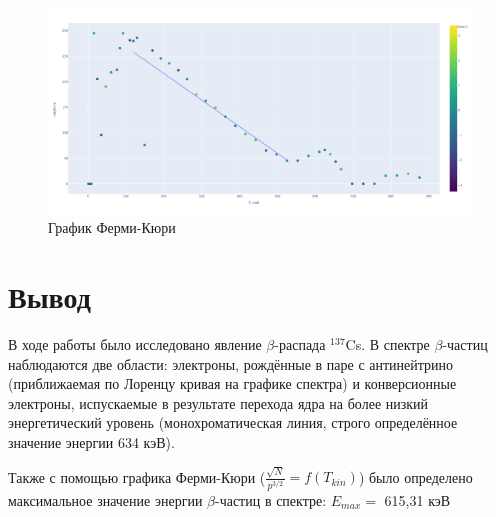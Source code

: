 \documentclass[15pt,a5paper,reqno]{article}
\begin{document}
\begin{enumerate}
\begin{figure}[h!]
			\centering
			\includegraphics[width=\linewidth]{pics/lab_542_2.png}
			\caption{График Ферми-Кюри}
		\end{figure}
		
\end{enumerate}

\section{Вывод}
	В ходе работы было исследовано явление $\beta$-распада $^{137}$Cs. В спектре $\beta$-частиц наблюдаются две области: электроны, рождённые в паре с антинейтрино (приближаемая по Лоренцу кривая на графике спектра) и конверсионные электроны, испускаемые в результате перехода ядра на более низкий энергетический уровень (монохроматическая линия, строго определённое значение энергии 634 кэВ). \par
	Также с помощью графика Ферми-Кюри ($\frac{\sqrt{N}}{p^{3/2}} = f(T_{kin})$) было определено максимальное значение энергии $\beta$-частиц в спектре: $E_{max} = $ 615,31 кэВ
\end{document}
